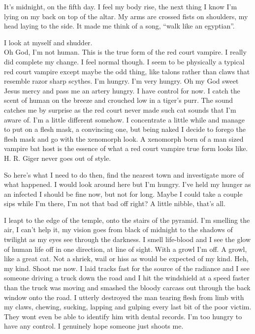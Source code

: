 It's midnight, on the fifth day. I feel my body rise, the next thing I know I'm lying on my back on top of the altar. My arms are crossed fists on shoulders, my head laying to the side. It made me think of a song, ``walk like an egyptian''.

\parasep

I look at myself and shudder.\\

Oh God, I'm not human. This is the true form of the red court vampire. I really did complete my change. I feel normal though. I seem to be physically a typical red court vampire except maybe the odd thing, like talons rather than claws that resemble razor sharp scythes. I'm hungry. I'm very hungry. Oh my God sweet Jesus mercy and pass me an artery hungry. I have control for now. I catch the scent of human on the breeze and crouched low in a tiger's purr. The sound catches me by surprise as the red court never made such cat sounds that I'm aware of. I'm a little different somehow. I concentrate a little while and manage to put on a flesh mask, a convincing one, but being naked I decide to forego the flesh mask and go with the xenomorph look. A xenomorph born of a man sized vampire bat host is the essence of what a red court vampire true form looks like. H. R. Giger never goes out of style. 

So here's what I need to do then, find the nearest town and investigate more of what happened. I would look around here but I'm hungry. I've held my hunger as an infected I should be fine now, but not for long. Maybe I could take a couple sips while I'm there, I'm not that bad off right? A little nibble, that's all.


I leapt to the edge of the temple, onto the stairs of the pyramid. I'm smelling the air, I can't help it, my vision goes from black of midnight to the shadows of twilight as my eyes see through the darkness. I smell life-blood and I see the glow of human life off in one direction, at line of sight. With a growl I'm off. A growl, like a great cat. Not a shriek, wail or hiss as would be expected of my kind. Heh, my kind. Shoot me now. I laid tracks fast for the source of the radiance and I see someone driving a truck down the road and I hit the windshield at a speed faster than the truck was moving and smashed the bloody carcass out through the back window onto the road. I utterly destroyed the man tearing flesh from limb with my claws, chewing, sucking, lapping and gulping every last bit of the poor victim. They wont even be able to identify him with dental records. I'm too hungry to have any control. I genuinely hope someone just shoots me.


